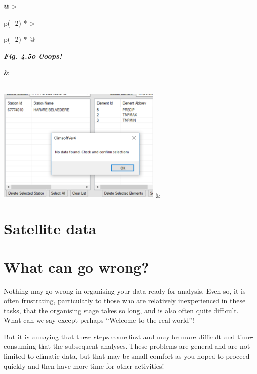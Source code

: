 \documentclass[
  letterpaper,
  DIV=11,
  numbers=noendperiod]{scrreprt}
\begin{document}
\begin{longtable}[]{@{}
  >{\raggedright\arraybackslash}p{(\columnwidth - 2\tabcolsep) * }
  >{\raggedright\arraybackslash}p{(\columnwidth - 2\tabcolsep) * }@{}}
\toprule\noalign{}
\begin{minipage}[b]{\linewidth}\raggedright
\textbf{\emph{Fig. 4.5o Ooops!}}
\end{minipage} & \begin{minipage}[b]{\linewidth}\raggedright
\end{minipage} \\
\midrule\noalign{}
\endhead
\bottomrule\noalign{}
\endlastfoot
\includegraphics[width=3.14224in,height=2.18435in]{figures/Fig4.5o.png}
& \\
\end{longtable}

\section{Satellite data}\label{satellite-data}

\section{What can go wrong?}\label{what-can-go-wrong}

Nothing may go wrong in organising your data ready for analysis. Even
so, it is often frustrating, particularly to those who are relatively
inexperienced in these tasks, that the organising stage takes so long,
and is also often quite difficult. What can we say except perhaps
``Welcome to the real world''!

But it is annoying that these steps come first and may be more difficult
and time-consuming that the subsequent analyses. These problems are
general and are not limited to climatic data, but that may be small
comfort as you hoped to proceed quickly and then have more time for
other activities!
\end{document}
